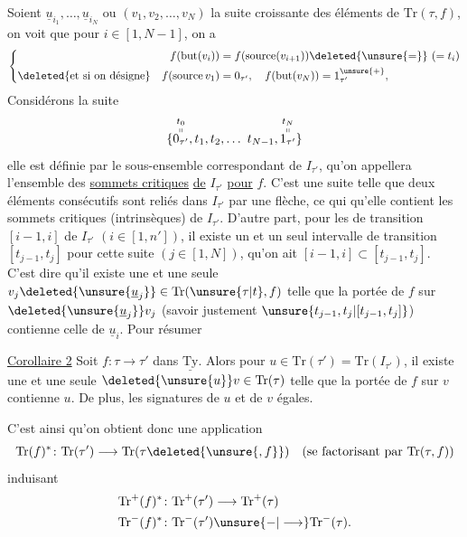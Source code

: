 Soient $\underline{u}_{i_1},\ldots,\underline{u}_{i_N}$ ou $(v_1,v_2,\ldots,v_N)$
la suite croissante des éléments de $\mathrm{Tr}(\tau,f)$,
on voit  que pour  $i\in[1,N-1]$, on a
\[
\left\{\begin{aligned}
 f(\operatorname{but}(v_i))&=f(\operatorname{source}(v_{i+1}))\deleted{\unsure{=}}\ ( = t_i)\\
 \deleted{\text{et si on désigne}}\quad f(\operatorname{source}v_1)&=0_{\tau'},\quad f(\operatorname{but}(v_N))=1_{\tau'}^{\unsure{+}},
\end{aligned}\right.
\]
Considérons la suite
\[
\{\overset{\substack{t_0\\\shortparallel}}{0_{\tau'}},t_1,t_2,\ldots\ t_{N-1},\overset{\substack{t_N\\\shortparallel}}{1_{\tau'}}\}
\]
elle est définie par le sous-ensemble correspondant de $I_{\tau'}$, qu'on appellera l'ensemble des
\uline{sommets critiques} \uline{de} $I_{\tau'}$ \uline{pour} $f$.  C'est
une suite  telle que deux éléments consécutifs
sont reliés dans $I_{\tau'}$ par une flèche, ce qui 
 qu'elle contient les sommets critiques (intrinsèques)
de $I_{\tau'}$.  D'autre part, pour les 
de transition $[i-1,i]$ de $I_{\tau'}$  $(i\in[1,n'])$,
il existe un et un seul intervalle de transition
 $[t_{j-1},t_j]$ pour cette suite $(j\in[1,N])$, 
qu'on ait $[i-1,i]\subset[t_{j-1},t_j]$. C'est dire qu'il
existe une et une seule $v_j\deleted{\unsure{\underline{u}_j}}\in\mathrm{Tr}(\unsure{\tau|t},f)$ telle
que la portée de $f$ sur $\deleted{\unsure{\underline{u}_j}}v_j$ (savoir justement
$\unsure{t_{j-1},t_j|[t_{j-1},t_j]}$) contienne celle de $\underline{u}_i$. Pour résumer

\uline{Corollaire 2} Soit $f\colon\tau\longrightarrow\tau'$ dans $\underline{\mathrm{Ty}}$. Alors
pour  $u\in\mathrm{Tr}(\tau')=\mathrm{Tr}(I_{\tau'})$, il existe une
et une seule $\deleted{\unsure{u}}v\in\mathrm{Tr}(\tau)$ telle que la portée
de $f$ sur $v$ contienne $u$.  De plus, les
signatures de $u$ et de $v$   égales.

C'est ainsi qu'on obtient donc une
application
\[
\mathrm{Tr}(f)^*\colon\mathrm{Tr}(\tau')\longrightarrow\mathrm{Tr}(\tau\deleted{\unsure{,f}})
\quad\text{(se factorisant par $\mathrm{Tr}(\tau,f)$)}
\]
induisant
\[
\begin{aligned}
\mathrm{Tr}^+(f)^*&\colon\mathrm{Tr}^+(\tau')\longrightarrow\mathrm{Tr}^+(\tau)\\
\mathrm{Tr}^-(f)^*&\colon\mathrm{Tr}^-(\tau')\unsure{\mathbin{-}|\longrightarrow}\mathrm{Tr}^-(\tau).
\end{aligned}
\]


